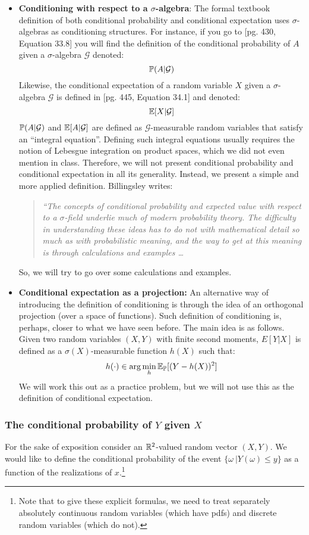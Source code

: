 \documentclass[11pt]{article} %
\begin{document}
\begin{itemize}
\item \textbf{Conditioning with respect to a $\sigma$-algebra}: The formal textbook definition of both conditional probability and conditional expectation uses $\sigma$-algebras as conditioning structures. For instance, if you go to \cite{Billingsley95} [pg. 430, Equation 33.8] you will find the definition of the conditional probability of $A$ given a $\sigma$-algebra $\mathcal{G}$ denoted:
$$\mathbb{P}(A | \mathcal{G})$$ 
\noindent Likewise, the conditional expectation of a random variable $X$ given a $\sigma$-algebra $\mathcal{G}$ is defined in [pg. 445, Equation 34.1] and denoted:
$$\mathbb{E}[X | \mathcal{G}] $$
\noindent $\mathbb{P}(A | \mathcal{G})$ and $\mathbb{E}[A | \mathcal{G}]$ are defined as $\mathcal{G}$-measurable random variables that satisfy an ``integral equation''. Defining such integral equations usually requires the notion of Lebesgue integration on product spaces, which we did not even mention in class. Therefore, we will not present conditional probability and conditional expectation in all its generality. Instead, we present a simple and more applied definition. Billingsley writes:
\begin{quote}
\emph{``The concepts of conditional probability and expected value with respect to a $\sigma$-field underlie much of modern probability theory. The difficulty in understanding these ideas has to do not with mathematical detail so much as with probabilistic meaning, and the way to get at this meaning is through calculations and examples \ldots }
\end{quote}
\noindent So, we will try to go over some calculations and examples. 

\item \textbf{Conditional expectation as a projection:} An alternative way of introducing the definition of conditioning is through the idea of an orthogonal projection (over a space of functions). Such definition of conditioning is, perhaps, closer to what we have seen before. The main idea is as follows. Given two random variables $(X,Y)$ with finite second moments, $E[Y|X]$ is defined as a $\sigma(X)$-measurable function $h(X)$ such that:
$$h(\cdot) \in \arg \min_{h} \mathbb{E}_{\mathbb{P}}[(Y-h(X))^2] $$ 
\noindent We will work this out as a practice problem, but we will not use this as the definition of conditional expectation. 
\end{itemize}


\subsubsection{The conditional probability of $Y$ given $X$}
For the sake of exposition consider an $\mathbb{R}^{2}$-valued random vector $(X, Y)$. We would like to define the conditional probability of the event $\{\omega \: | Y(\omega) \leq y\}$ as a function of the realizations of $x$.\footnote{\noindent Note that to give these explicit formulas, we need to treat separately absolutely continuous random variables (which have pdfs) and discrete random variables (which do not).}\\
\end{document}
